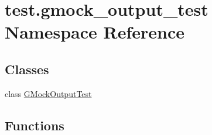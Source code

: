 \hypertarget{namespacetest_1_1gmock__output__test}{}\section{test.\+gmock\+\_\+output\+\_\+test Namespace Reference}
\label{namespacetest_1_1gmock__output__test}
\subsection*{Classes}
\begin{DoxyCompactItemize}
\item 
class \mbox{\hyperlink{classtest_1_1gmock__output__test_1_1_g_mock_output_test}{G\+Mock\+Output\+Test}}
\end{DoxyCompactItemize}
\subsection*{Functions}

